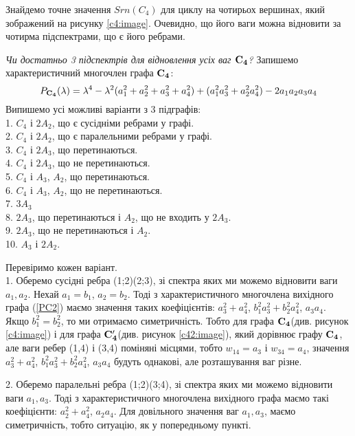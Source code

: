 Знайдемо точне значення $Srn(C_4)$ для циклу на чотирьох вершинах, який зображений на рисунку \ref{c4:image}. Очевидно, що його ваги можна відновити за чотирма підспектрами, що є його ребрами.

\textit{Чи достатньо 3 підспектрів для відновлення усіх ваг $\bf C_4$?}
Запишемо характеристичний многочлен графа $\bf C_4$:
\begin{equation}\label{PC2}
    P_{\bf C_4}(\lambda) = \lambda^{4}-\lambda^{2}(a^2_{1} + a^2_{2} + a^2_{3} + a^2_{4})+(a^2_{1}a^2_{3} + a^2_{2}a^2_{4})-2a_{1}a_{2}a_{3}a_{4}
\end{equation}
Випишемо усі можливі варіанти з 3 підграфів:\\
1. $C_4$ і $2A_2$, що є сусідніми ребрами у графі.\\
2. $C_4$ і $2A_2$, що є паралельними ребрами у графі.\\
3. $C_4$ і $2A_3$, що перетинаються.\\
4. $C_4$ і $2A_3$, що не перетинаються.\\
5. $C_4$ і $A_3$, $A_2$, що перетинаються.\\
6. $C_4$ і $A_3$, $A_2$, що не перетинаються.\\
7. $3A_3$\\
8. $2A_3$, що перетинаються і $A_2$, що не входить у $2A_3$.\\
9. $2A_3$, що не перетинаються і $A_2$.\\
10. $A_3$ і $2A_2$.

Перевіримо кожен варіант.\\
1. Оберемо сусідні ребра (1;2)(2;3), зі спектра яких ми можемо відновити ваги $a_1, 
a_2$. Нехай $a_1 = b_1$, $a_2 = b_2$.
Тоді з характеристичного многочлена вихідного графа (\ref{PC2}) маємо значення таких коефіцієнтів: $a_3^2+a_4^2$, $b_1^2a_3^2+b_2^2a_4^2$, $a_3a_4$. Якщо $b_1^2=b_2^2$, то ми отримаємо симетричність. Тобто для графа ${\bf C_4}$(див. рисунок \ref{c4:image}) і для графа ${\bf C'_4}$(див. рисунок \ref{c42:image}), який дорівнює графу ${\bf C_4}$, але ваги ребер (1,4) і (3,4) поміняні місцями, тобто $w_{14} = a_3$ і $w_{34} = a_4$, значення $a_3^2+a_4^2$, $b_1^2a_3^2+b_2^2a_4^2$, $a_3a_4$ будуть однакові, але розташування ваг різне.


2. Оберемо паралельні ребра (1;2)(3;4), зі спектра яких ми можемо відновити ваги $a_1, 
a_3$. Тоді з характеристичного многочлена вихідного графа маємо такі коефіцієнти: $a_2^2+a_4^2$, $a_2a_4$. Для довільного значення ваг $a_1,a_3$, маємо симетричність, тобто ситуацію, як у попередньому пункті.

